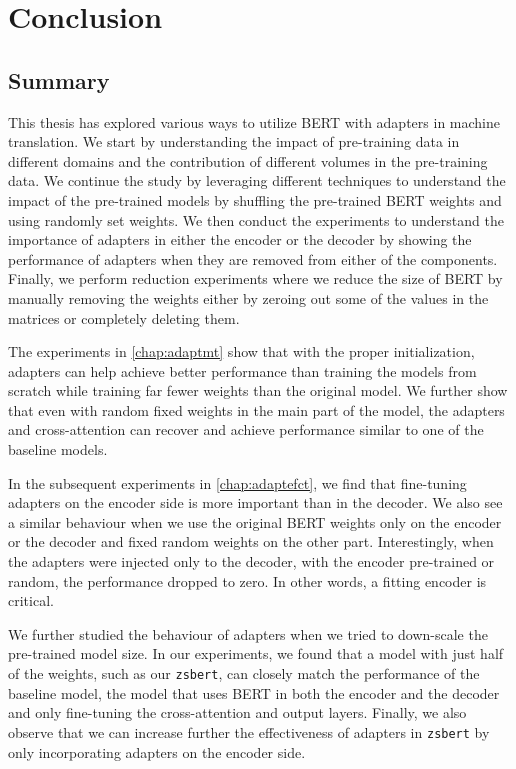 \chapter*{Conclusion}

\section{Summary}
This thesis has explored various ways to utilize BERT with adapters in machine translation. We start by understanding the impact of pre-training data in different domains and the contribution of different volumes in the pre-training data. We continue the study by leveraging different techniques to understand the impact of the pre-trained models by shuffling the pre-trained BERT weights and using randomly set weights. We then conduct the experiments to understand the importance of adapters in either the encoder or the decoder by showing the performance of adapters when they are removed from either of the components. Finally, we perform reduction experiments where we reduce the size of BERT by manually removing the weights either by zeroing out some of the values in the matrices or completely deleting them.

The experiments in \cref{chap:adaptmt} show that with the proper initialization, adapt\-ers can help achieve better performance than training the models from scratch while training far fewer weights than the original model. We further show that even with random fixed weights in the main part of the model, the adapters and cross-attention can recover and achieve performance similar to one of the baseline models.

In the subsequent experiments in \cref{chap:adaptefct}, we find that fine-tuning adapters on the encoder side is more important than in the decoder. We also see a similar behaviour when we use the original BERT weights only on the encoder or the decoder and fixed random weights on the other part. Interestingly, when the adapters were injected only to the decoder, with the encoder pre-trained or random, the performance dropped to zero. In other words, a fitting encoder is critical.

We further studied the behaviour of adapters when we tried to down-scale the pre-trained model size. In our experiments, we found that a model with just half of the weights, such as our \texttt{zsbert}, can closely match the performance of the baseline model, the model that uses BERT in both the encoder and the decoder and only fine-tuning the cross-attention and output layers. Finally, we also observe that we can increase further the effectiveness of adapters in \texttt{zsbert} by only incorporating adapters on the encoder side.


